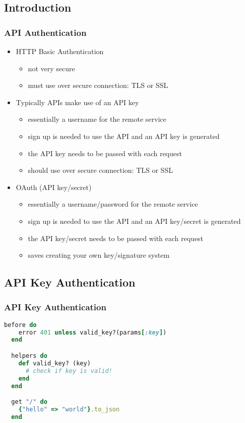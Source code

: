 \documentclass{beamer}
\begin{document}
\subsection{Introduction}
\begin{frame}[fragile]\frametitle{API Authentication} 

  \begin{itemize}
    \item HTTP Basic Authentication
    \begin{itemize}
      \item not very secure
      \item must use over secure connection: TLS or SSL
    \end{itemize}
    
    \item Typically APIs make use of an API key
    \begin{itemize}
      \item essentially a username for the remote service
      \item sign up is needed to use the API and an API key is generated 
      \item the API key needs to be passed with each request
      \item should use over secure connection: TLS or SSL
    \end{itemize}

    \item OAuth (API key/secret)
    \begin{itemize}
      \item essentially a username/password for the remote service
      \item sign up is needed to use the API and an API key/secret is generated 
      \item the API key/secret needs to be passed with each request
      \item saves creating your own key/signature system
    \end{itemize}

  \end{itemize}

\end{frame}


\subsection{API Key Authentication}
\begin{frame}[fragile]\frametitle{API Key Authentication} 

  \begin{lstlisting}[language=ruby, escapechar={^}]
  before do
    error 401 unless valid_key?(params[:key])
  end

  helpers do
    def valid_key? (key)
      # check if key is valid!
    end
  end

  get "/" do
    {"hello" => "world"}.to_json
  end
  \end{lstlisting}

\end{frame}
\end{document}
